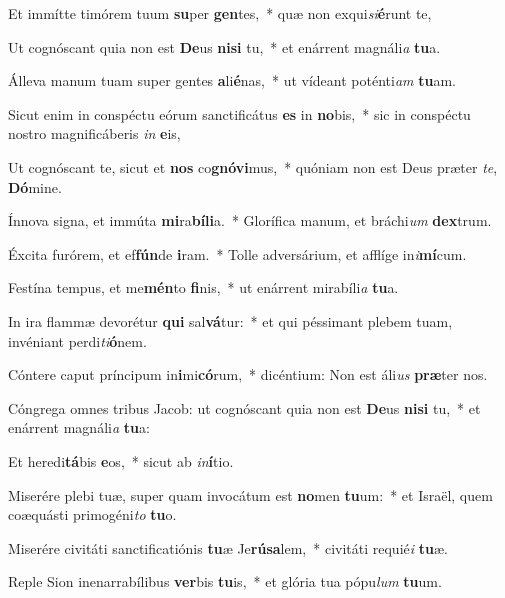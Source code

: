 \item Et immítte timórem tuum \textbf{su}per \textbf{gen}tes,~* quæ non exqui\textit{si}\textbf{é}runt te,
\item Ut cognóscant quia non est \textbf{De}us \textbf{ni}\textbf{si} tu,~* et enárrent magnáli\textit{a} \textbf{tu}a.
\item Álleva manum tuam super gentes \textbf{a}li\textbf{é}nas,~* ut vídeant poténti\textit{am} \textbf{tu}am.
\item Sicut enim in conspéctu eórum sanctificátus \textbf{es} in \textbf{no}bis,~* sic in conspéctu nostro magnificáberis \textit{in} \textbf{e}is,
\item Ut cognóscant te, sicut et \textbf{nos} co\textbf{gnó}\textbf{vi}mus,~* quóniam non est Deus præter \textit{te}, \textbf{Dó}mine.
\item Ínnova signa, et immúta \textbf{mi}ra\textbf{bí}\textbf{li}a.~* Glorífica manum, et bráchi\textit{um} \textbf{dex}trum.
\item Éxcita furórem, et ef\textbf{fún}de \textbf{i}ram.~* Tolle adversárium, et afflíge in\textit{i}\textbf{mí}cum.
\item Festína tempus, et me\textbf{mén}to \textbf{fi}nis,~* ut enárrent mirabíli\textit{a} \textbf{tu}a.
\item In ira flammæ devorétur \textbf{qui} sal\textbf{vá}tur:~* et qui péssimant plebem tuam, invéniant perdi\textit{ti}\textbf{ó}nem.
\item Cóntere caput príncipum in\textbf{i}mi\textbf{có}rum,~* dicéntium: Non est áli\textit{us} \textbf{præ}ter nos.
\item Cóngrega omnes tribus Jacob: ut cognóscant quia non est \textbf{De}us \textbf{ni}\textbf{si} tu,~* et enárrent magnáli\textit{a} \textbf{tu}a:
\item Et heredi\textbf{tá}bis \textbf{e}os,~* sicut ab \textit{in}\textbf{í}tio.
\item Miserére plebi tuæ, super quam invocátum est \textbf{no}men \textbf{tu}um:~* et Israël, quem coæquásti primogéni\textit{to} \textbf{tu}o.
\item Miserére civitáti sanctificatiónis \textbf{tu}æ Je\textbf{rú}\textbf{sa}lem,~* civitáti requié\textit{i} \textbf{tu}æ.
\item Reple Sion inenarrabílibus \textbf{ver}bis \textbf{tu}is,~* et glória tua pópu\textit{lum} \textbf{tu}um.

